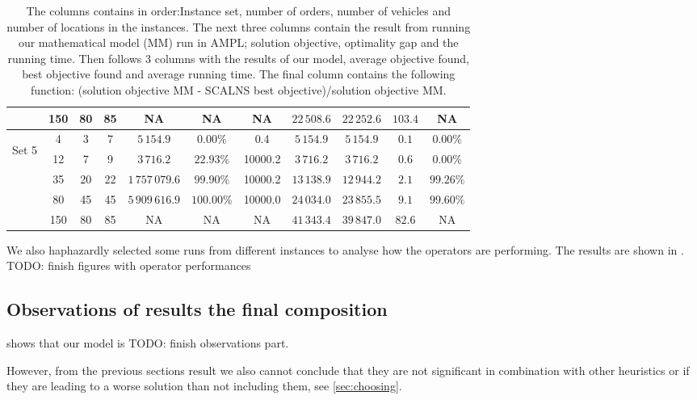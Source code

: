 \documentclass[../main.tex]{subfiles}
\begin{document}
\begin{table}
\begin{adjustbox}{width=0.95\columnwidth,center}
\begin{tabular}{|cccc|ccc|ccc|c|}
                        & 150     & 80    & 85    & NA              & NA            & NA        & $22\,508.6$   & $22\,252.6$   & $103.4$   & NA  \\
            \hline
                \multirow{5}{*}{\begin{sideways} Set 5 \end{sideways}}  
                        & 4       & 3     & 7     & $5\,154.9$      & $0.00\%$      & 0.4       & $5\,154.9$    & $5\,154.9$    & $0.1$     & $0.00\%$  \\
                        & 12      & 7     & 9     & $3\,716.2$      & $22.93\%$     & 10000.2   & $3\,716.2$    & $3\,716.2$    & $0.6$     & $0.00\%$  \\
                        & 35      & 20    & 22    & $1\,757\,079.6$ & $99.90\%$     & 10000.2   & $13\,138.9$   & $12\,944.2$   & $2.1$     & $99.26\%$  \\
                        & 80      & 45    & 45    & $5\,909\,616.9$ & $100.00\%$    & 10000.0   & $24\,034.0$   & $23\,855.5$   & $9.1$     & $99.60\%$  \\
                        & 150     & 80    & 85    & NA              & NA            & NA        & $41\,343.4$   & $39\,847.0$   & $82.6$    & NA  \\
            \hline
            \end{tabular}
    \end{adjustbox}
    \label{tab:finRes}
    \caption*{The columns contains in order:Instance set, number of orders, number of vehicles and number of locations in the instances. 
    The next three columns contain the result from running our mathematical model (MM) run in AMPL; solution objective, optimality gap and the running time.
    Then follows 3 columns with the results of our model, average objective found, best objective found and average running time. 
    The final column contains the following function: (solution objective MM - SCALNS best objective)/solution objective MM.}
\end{table}



We also haphazardly selected some runs from different instances to analyse how the operators are performing.
The results are shown in .
TODO: finish figures with operator performances

\subsection{Observations of results  the final composition}
\label{sec:finalObs}
 shows that our model is TODO: finish observations part.

However, from the previous sections result we also cannot conclude that they are not significant in combination with other heuristics or if they are leading to a worse solution than not including them, see \ref{sec:choosing}. 

\biblio                                                         
\end{document}
